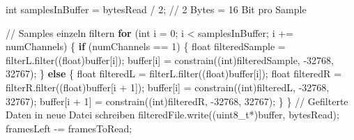 \documentclass[
  ngerman,
  letterpaper,
  DIV=11]{scrreprt}
\newenvironment{Shaded}{\begin{snugshade}}{\end{snugshade}}
\newcommand{\CommentTok}[1]{\textcolor[rgb]{0.37,0.37,0.37}{#1}}
\newcommand{\ControlFlowTok}[1]{\textcolor[rgb]{0.00,0.23,0.31}{\textbf{#1}}}
\newcommand{\DataTypeTok}[1]{\textcolor[rgb]{0.68,0.00,0.00}{#1}}
\newcommand{\DecValTok}[1]{\textcolor[rgb]{0.68,0.00,0.00}{#1}}
\newcommand{\NormalTok}[1]{\textcolor[rgb]{0.00,0.23,0.31}{#1}}
\newcommand{\OperatorTok}[1]{\textcolor[rgb]{0.37,0.37,0.37}{#1}}
\begin{document}
\begin{Shaded}
\begin{Highlighting}[]
    \DataTypeTok{int}\NormalTok{ samplesInBuffer }\OperatorTok{=}\NormalTok{ bytesRead }\OperatorTok{/} \DecValTok{2}\OperatorTok{;} \CommentTok{// 2 Bytes = 16 Bit pro Sample}


    \CommentTok{// Samples einzeln filtern}
    \ControlFlowTok{for} \OperatorTok{(}\DataTypeTok{int}\NormalTok{ i }\OperatorTok{=} \DecValTok{0}\OperatorTok{;}\NormalTok{ i }\OperatorTok{\textless{}}\NormalTok{ samplesInBuffer}\OperatorTok{;}\NormalTok{ i }\OperatorTok{+=}\NormalTok{ numChannels}\OperatorTok{)} \OperatorTok{\{}
      \ControlFlowTok{if} \OperatorTok{(}\NormalTok{numChannels }\OperatorTok{==} \DecValTok{1}\OperatorTok{)} \OperatorTok{\{}
        \DataTypeTok{float}\NormalTok{ filteredSample }\OperatorTok{=}\NormalTok{ filterL}\OperatorTok{.}\NormalTok{filter}\OperatorTok{((}\DataTypeTok{float}\OperatorTok{)}\NormalTok{buffer}\OperatorTok{[}\NormalTok{i}\OperatorTok{]);}
\NormalTok{        buffer}\OperatorTok{[}\NormalTok{i}\OperatorTok{]} \OperatorTok{=}\NormalTok{ constrain}\OperatorTok{((}\DataTypeTok{int}\OperatorTok{)}\NormalTok{filteredSample}\OperatorTok{,} \OperatorTok{{-}}\DecValTok{32768}\OperatorTok{,} \DecValTok{32767}\OperatorTok{);}
      \OperatorTok{\}}
      \ControlFlowTok{else} \OperatorTok{\{}
        \DataTypeTok{float}\NormalTok{ filteredL }\OperatorTok{=}\NormalTok{ filterL}\OperatorTok{.}\NormalTok{filter}\OperatorTok{((}\DataTypeTok{float}\OperatorTok{)}\NormalTok{buffer}\OperatorTok{[}\NormalTok{i}\OperatorTok{]);}
        \DataTypeTok{float}\NormalTok{ filteredR }\OperatorTok{=}\NormalTok{ filterR}\OperatorTok{.}\NormalTok{filter}\OperatorTok{((}\DataTypeTok{float}\OperatorTok{)}\NormalTok{buffer}\OperatorTok{[}\NormalTok{i }\OperatorTok{+} \DecValTok{1}\OperatorTok{]);}
\NormalTok{        buffer}\OperatorTok{[}\NormalTok{i}\OperatorTok{]} \OperatorTok{=}\NormalTok{ constrain}\OperatorTok{((}\DataTypeTok{int}\OperatorTok{)}\NormalTok{filteredL}\OperatorTok{,} \OperatorTok{{-}}\DecValTok{32768}\OperatorTok{,} \DecValTok{32767}\OperatorTok{);}
\NormalTok{        buffer}\OperatorTok{[}\NormalTok{i }\OperatorTok{+} \DecValTok{1}\OperatorTok{]} \OperatorTok{=}\NormalTok{ constrain}\OperatorTok{((}\DataTypeTok{int}\OperatorTok{)}\NormalTok{filteredR}\OperatorTok{,} \OperatorTok{{-}}\DecValTok{32768}\OperatorTok{,} \DecValTok{32767}\OperatorTok{);}
      \OperatorTok{\}}
    \OperatorTok{\}}
    \CommentTok{// Gefilterte Daten in neue Datei schreiben}
\NormalTok{    filteredFile}\OperatorTok{.}\NormalTok{write}\OperatorTok{((}\DataTypeTok{uint8\_t}\OperatorTok{*)}\NormalTok{buffer}\OperatorTok{,}\NormalTok{ bytesRead}\OperatorTok{);}
\NormalTok{    framesLeft }\OperatorTok{{-}=}\NormalTok{ framesToRead}\OperatorTok{;}
\end{Highlighting}
\end{Shaded}
\end{document}
